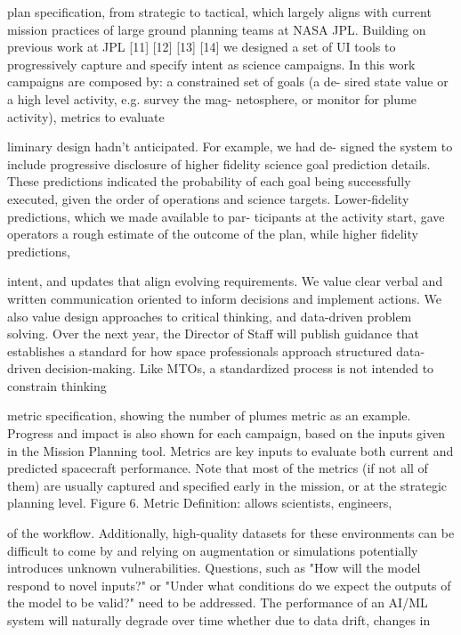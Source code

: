 \documentclass[a4paper,12pt]{article}
\begin{document}
plan speciﬁcation, from strategic to tactical, which largely
aligns with current mission practices of large ground planning
teams at NASA JPL. Building on previous work at JPL [11]
[12] [13] [14] we designed a set of UI tools to progressively
capture and specify intent as science campaigns. In this work
campaigns are composed by: a constrained set of goals (a de-
sired state value or a high level activity, e.g. survey the mag-
netosphere, or monitor for plume activity), metrics to evaluate

liminary design hadn’t anticipated. For example, we had de-
signed the system to include progressive disclosure of higher
ﬁdelity science goal prediction details.
These predictions
indicated the probability of each goal being successfully
executed, given the order of operations and science targets.
Lower-ﬁdelity predictions, which we made available to par-
ticipants at the activity start, gave operators a rough estimate
of the outcome of the plan, while higher ﬁdelity predictions,

intent, and updates that align evolving requirements.  We 
value clear verbal and written communication oriented to 
inform decisions and implement actions. 
We also value design approaches to critical thinking, and 
data-driven problem solving. Over the next year, the 
Director of Staff will publish guidance that establishes a 
standard 
for 
how 
space 
professionals 
approach 
structured data-driven decision-making. Like MTOs, a 
standardized process is not intended to constrain thinking

metric speciﬁcation, showing the number of plumes metric
as an example. Progress and impact is also shown for each
campaign, based on the inputs given in the Mission Planning
tool.
Metrics are key inputs to evaluate both current and
predicted spacecraft performance.
Note that most of the
metrics (if not all of them) are usually captured and speciﬁed
early in the mission, or at the strategic planning level.
Figure 6. Metric Deﬁnition: allows scientists, engineers,

of the workﬂow. Additionally, high-quality datasets for these environments can be diﬃcult to come by and relying on
augmentation or simulations potentially introduces unknown vulnerabilities. Questions, such as "How will the model
respond to novel inputs?" or "Under what conditions do we expect the outputs of the model to be valid?" need to be
addressed. The performance of an AI/ML system will naturally degrade over time whether due to data drift, changes in
\end{document}

